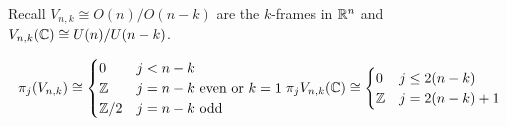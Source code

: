 \documentclass[12pt,class=article,crop=false]{standalone}
\begin{document}
Recall $ V_{n,k} \cong O(n) /O(n-k)$ are the $ k$-frames in  $ \mathbb{R}^{n}$ and $ V_{n,k}( \mathbb{C}) \cong U(n) / U(n-k)$.
\begin{coro}
\begin{align*}
 \pi_j(V_{n,k}) \cong \begin{cases}
	 0 & j<n-k\\
	 \mathbb{Z} & j=n-k \text{ even or } k=1\\
	 \mathbb{Z} /2 & j=n-k \text{ odd}\\ 
 \end{cases}
 \pi_jV_{n,k}( \mathbb{C}) \cong \begin{cases}
	 0& j \leq 2(n-k)\\
	 \mathbb{Z} & j=2(n-k)+1\\
 \end{cases}
\end{align*}
\end{coro}
\end{document}
